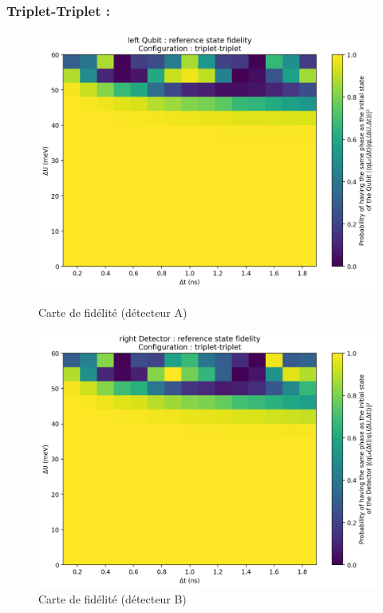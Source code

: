 \documentclass{article}
\begin{document}
\subsubsection{Triplet-Triplet :}

\begin{figure}[H]
  \centering
  \begin{minipage}[c]{0.48\textwidth}
    \centering
    \includegraphics[width=\textwidth]{qubit_results/triplet-triplet__psi0_15x15/images/15x15__triplet-triplet__qubit/p_qubit_overlap_map_left_15x15_20250822-181026.png}
    \caption{Carte de fidélité (détecteur A)}
    \label{fig:fidelity_map_a}
  \end{minipage}\hfill
  \begin{minipage}[c]{0.48\textwidth}
    \centering
    \includegraphics[width=\textwidth]{detector_results/triplet-triplet__psi0_15x15/images/15x15__triplet-triplet__detector/p_detector_overlap_map_15x15_20250822-184347.png}
    \caption{Carte de fidélité (détecteur B)}
    \label{fig:fidelity_map_b}
  \end{minipage}
\end{figure}
\end{document}
